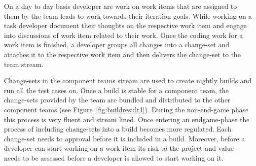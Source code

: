 On a day to day basis developer are work on work items that are assigned to them by the team leads to work towards their iteration goals.
While working on a task developer document their thoughts on the respective work item and engage into discussions of work item related to their work.
Once the coding work for a work item is finished, a developer groups all changes into a change-set and attaches it to the respective work item and then delivers the change-set to the team stream.

Change-sets in the component teams stream are used to create nightly builds and run all the test cases on.
Once a build is stable for a component team, the change-sets provided by the team are bundled and distributed to the other component teams (see Figure~\ref{fig:buildresult1}).
During the non-end-game phase this process is very fluent and stream lined.
Once entering an endgame-phase the process of including change-sets into a build becomes more regulated.
Each change-set needs to approval before it is included in a build.
Moreover, before a developer can start working on a work item its risk to the project and value needs to be assessed before a developer is allowed to start working on it.

